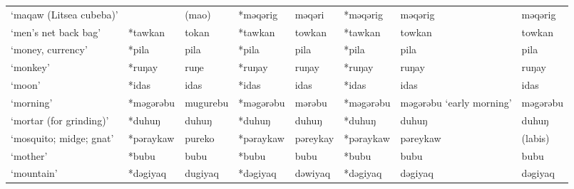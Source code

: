 \begin{landscape}
\begin{longtable}[c]{@{}p{3cm}<{\raggedright}p{2.75cm}<{\raggedright}p{2.75cm}<{\raggedright}p{2.75cm}<{\raggedright}p{2.75cm}<{\raggedright}p{2.75cm}<{\raggedright}p{2.75cm}<{\raggedright}p{2.75cm}<{\raggedright}@{}}
`maqaw (Litsea cubeba)'                              &            & (mao)                          & *məqərig           & məqəri                     & *məqərig         & məqərig                  & məqərig                           \\
`men's net back bag'                                 & *tawkan            & tokan                          & *tawkan            & towkan                     & *tawkan          & towkan                   & towkan                            \\
`money, currency'                                    & *pila              & pila                           & *pila              & pila                       & *pila            & pila                     & pila                              \\
`monkey'                                             & *ruŋay             & ruŋe                           & *ruŋay             & ruŋay                      & *ruŋay           & ruŋay                    & ruŋay                             \\
`moon'                                               & *idas              & idas                           & *idas              & idas                       & *idas            & idas                     & idas                              \\
`morning'                                            & *məgərəbu          & mugurebu                       & *məgərəbu          & mərəbu                     & *məgərəbu        & məgərəbu `early morning' & məgərəbu                          \\
`mortar (for grinding)'                              & *duhuŋ             & duhuŋ                          & *duhuŋ             & duhuŋ                      & *duhuŋ           & duhuŋ                    & duhuŋ                             \\
`mosquito; midge; gnat'                              & *pəraykaw          & pureko                         & *pəraykaw          & pəreykay                   & *pəraykaw        & pəreykaw                 & (labis)                           \\
`mother'                                             & *bubu              & bubu                           & *bubu              & bubu                       & *bubu            & bubu                     & bubu                              \\
`mountain'                                           & *dəgiyaq           & dugiyaq                        & *dəgiyaq           & dəwiyaq                    & *dəgiyaq         & dəgiyaq                  & dəgiyaq                           \\

\end{longtable}
\end{landscape}
